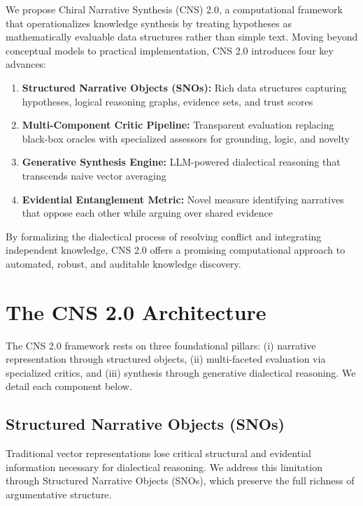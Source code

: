 \documentclass[12pt, a4paper]{article}
\begin{document}
We propose Chiral Narrative Synthesis (CNS) 2.0, a computational framework that operationalizes knowledge synthesis by treating hypotheses as mathematically evaluable data structures rather than simple text. Moving beyond conceptual models to practical implementation, CNS 2.0 introduces four key advances:
\begin{enumerate}
    \item \textbf{Structured Narrative Objects (SNOs):} Rich data structures capturing hypotheses, logical reasoning graphs, evidence sets, and trust scores
    \item \textbf{Multi-Component Critic Pipeline:} Transparent evaluation replacing black-box oracles with specialized assessors for grounding, logic, and novelty
    \item \textbf{Generative Synthesis Engine:} LLM-powered dialectical reasoning that transcends naive vector averaging
    \item \textbf{Evidential Entanglement Metric:} Novel measure identifying narratives that oppose each other while arguing over shared evidence
\end{enumerate}

By formalizing the dialectical process of resolving conflict and integrating independent knowledge, CNS 2.0 offers a promising computational approach to automated, robust, and auditable knowledge discovery.

\section{The CNS 2.0 Architecture}
The CNS 2.0 framework rests on three foundational pillars: (i) narrative representation through structured objects, (ii) multi-faceted evaluation via specialized critics, and (iii) synthesis through generative dialectical reasoning. We detail each component below.

\subsection{Structured Narrative Objects (SNOs)}
Traditional vector representations lose critical structural and evidential information necessary for dialectical reasoning. We address this limitation through Structured Narrative Objects (SNOs), which preserve the full richness of argumentative structure.
\end{document}
